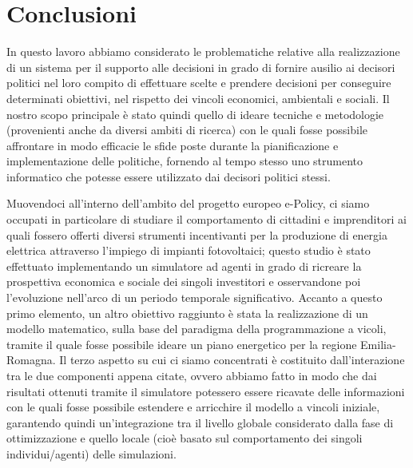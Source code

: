 


%

\clearpage{\pagestyle{empty}\cleardoublepage}
\chapter*{Conclusioni}


In questo lavoro abbiamo considerato le problematiche relative alla realizzazione di un sistema per il supporto alle decisioni in grado di fornire ausilio ai decisori politici nel loro compito di effettuare scelte e prendere decisioni per conseguire determinati obiettivi, nel rispetto dei vincoli economici, ambientali e sociali. Il nostro scopo principale è stato quindi quello di ideare tecniche e metodologie (provenienti anche da diversi ambiti di ricerca) con le quali fosse possibile affrontare in modo efficacie le sfide poste durante la pianificazione e implementazione delle politiche, fornendo al tempo stesso uno strumento informatico che potesse essere utilizzato dai decisori politici stessi. 

Muovendoci all'interno dell'ambito del progetto europeo e-Policy, ci siamo occupati in particolare di studiare il comportamento di cittadini e imprenditori ai quali fossero offerti diversi strumenti incentivanti per la produzione di energia elettrica attraverso l'impiego di impianti fotovoltaici; questo studio è stato effettuato implementando un simulatore ad agenti in grado di ricreare la prospettiva economica e sociale dei singoli investitori e osservandone poi l'evoluzione nell'arco di un periodo temporale significativo. Accanto a questo primo elemento, un altro obiettivo raggiunto è stata la realizzazione di un modello matematico, sulla base del paradigma della programmazione a vicoli, tramite il quale fosse possibile ideare un piano energetico per la regione Emilia-Romagna. Il terzo aspetto su cui ci siamo concentrati è costituito dall'interazione tra le due componenti appena citate, ovvero abbiamo fatto in modo che dai risultati ottenuti tramite il simulatore potessero essere ricavate delle informazioni con le quali fosse possibile estendere e arricchire il modello a vincoli iniziale, garantendo quindi un'integrazione tra il livello globale considerato dalla fase di ottimizzazione e quello locale (cioè basato sul comportamento dei singoli individui/agenti) delle simulazioni.

